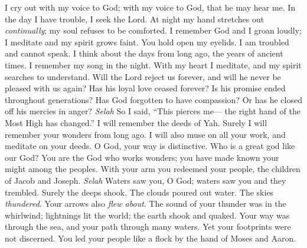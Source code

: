 \begin{biblechapter} %
 I cry out with my voice to God; 
with my voice to God, that he may hear me.
\verse In the day I have trouble, I seek the Lord. 
At night my hand stretches out \textit{continually}; 
my soul refuses to be comforted.
\verse I remember God and I groan loudly; 
I meditate and my spirit grows faint.
\verse You hold open my eyelids. 
I am troubled and cannot speak.
\verse I think about the days from long ago, 
the years of ancient times.
\verse I remember my song in the night. 
With my heart I meditate, 
and my spirit searches to understand.
\verse Will the Lord reject us forever, 
and will he never be pleased with us again?
\verse Has his loyal love ceased forever? 
Is his promise ended throughout generations?
\verse Has God forgotten to have compassion? 
Or has he closed off his mercies in anger? \textit{Selah}
\verse So I said, “This pierces me— 
the right hand of the Most High has changed.”
\verse I will remember the deeds of Yah. 
Surely I will remember your wonders from long ago.
\verse I will also muse on all your work, 
and meditate on your deeds.
\verse O God, your way is distinctive. 
Who is a great god like our God?
\verse You are the God who works wonders; 
you have made known your might among the peoples.
\verse With your arm you redeemed your people, 
the children of Jacob and Joseph. \textit{Selah}
\verse Waters saw you, O God; 
waters saw you and they trembled. 
Surely the deeps shook.
\verse The clouds poured out water. 
The skies \textit{thundered}. 
Your arrows also \textit{flew about}.
\verse The sound of your thunder was in the whirlwind; 
lightnings lit the world; 
the earth shook and quaked.
\verse Your way was through the sea, 
and your path through many waters. 
Yet your footprints were not discerned.
\verse You led your people like a flock 
by the hand of Moses and Aaron.
\end{biblechapter}

